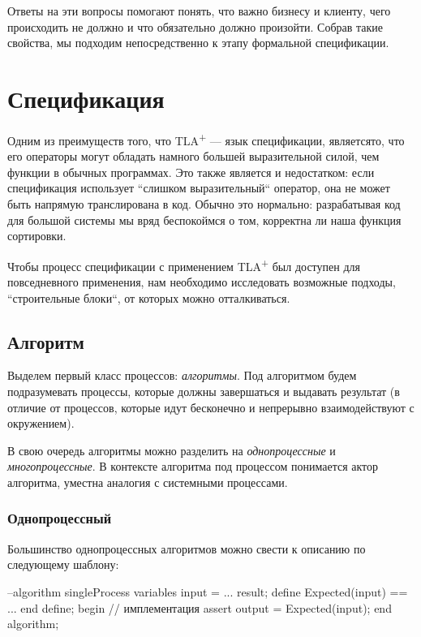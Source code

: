 \documentclass[14pt, openany]{book}
\newcommand{\tlapl}{TLA\textsuperscript{+} }
\begin{document}
Ответы на эти вопросы помогают понять, что важно бизнесу и клиенту, чего происходить не должно и что обязательно должно произойти. Собрав такие свойства, мы подходим непосредственно к этапу формальной спецификации.

\section{Спецификация}
Одним из преимуществ того, что \tlapl --- язык спецификации, являетсято, что его операторы могут обладать намного большей выразительной силой, чем функции в обычных программах. Это также является и недостатком: если спецификация использует ``слишком выразительный`` оператор, она не может быть напрямую транслирована в код. Обычно это нормально: разрабатывая код для большой системы мы вряд беспокоймся о том, корректна ли наша функция сортировки.

Чтобы процесс спецификации с применением \tlapl был доступен для повседневного применения, нам необходимо исследовать возможные подходы, ``строительные блоки``, от которых можно отталкиваться. 

\subsection{Алгоритм}
Выделем первый класс процессов: \emph{алгоритмы}. Под алгоритмом будем подразумевать процессы, которые должны завершаться и выдавать результат (в отличие от процессов, которые идут бесконечно и непрерывно взаимодействуют с окружением).

В свою очередь алгоритмы можно разделить на \emph{однопроцессные} и \emph{многопроцессные}. В контексте алгоритма под процессом понимается актор алгоритма, уместна аналогия с системными процессами.

\subsubsection{Однопроцессный}

Большинство однопроцессных алгоритмов можно свести к описанию по следующему шаблону:
\begin{ppcal}
  --algorithm singleProcess
    variables
      input = ...
      result;
    define
      Expected(input) == ...
    end define;
    begin
      \* // имплементация
      assert output = Expected(input);
    end algorithm;
\end{ppcal}
\begin{tlatex}
%
%
%
%
%
%
%
%
%
%
\@xx{}%
%
%
\end{tlatex}
\end{document}
